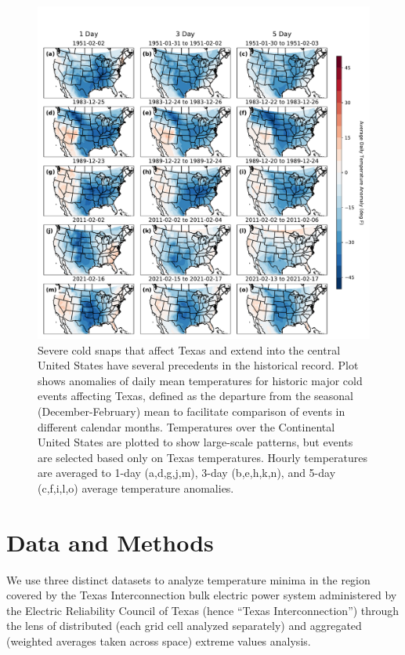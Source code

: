 \documentclass[12pt]{iopart}
\begin{document}
\begin{figure}
  \centering
  \includegraphics[width=\textwidth]{historic_events_era5.pdf}
  \caption{
    Severe cold snaps that affect Texas and extend into the central United States have several precedents in the historical record.
    Plot shows anomalies of daily mean temperatures for historic major cold events affecting Texas, defined as the departure from the seasonal (December-February) mean to facilitate comparison of events in different calendar months.
    Temperatures over the Continental United States are plotted to show large-scale patterns, but events are selected based only on Texas temperatures.
    Hourly temperatures are averaged to 1-day (a,d,g,j,m), 3-day (b,e,h,k,n), and 5-day (c,f,i,l,o) average temperature anomalies.
  }\label{fig:historic_era5}
\end{figure}

\section{Data and Methods}

We use three distinct datasets to analyze temperature minima in the region covered by the Texas Interconnection bulk electric power system administered by the Electric Reliability Council of Texas (hence ``Texas Interconnection'') through the lens of distributed (each grid cell analyzed separately) and aggregated (weighted averages taken across space) extreme values analysis.
\end{document}
